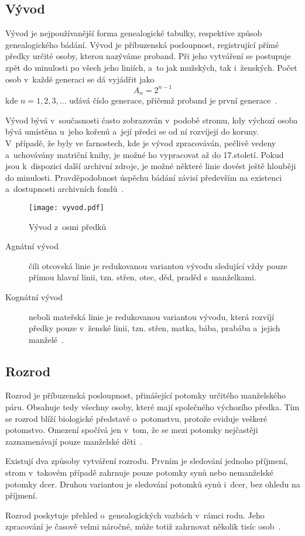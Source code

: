 		\subsection*{Vývod}
		Vývod je nejpoužívanější forma genealogické tabulky, respektive způsob genealogického bádání. Vývod je příbuzenská posloupnost, registrující přímé předky určité osoby, kterou nazýváme proband. Při jeho vytváření se postupuje zpět do minulosti po všech jeho liniích, a~to jak mužských, tak i~ženských. Počet osob v~každé generaci se dá vyjádřit jako 
		\[ A_n = 2^{n-1} \]
		kde \(n = 1, 2, 3, ...\) udává číslo generace, přičemž proband je první generace~\cite{bib:GeneZakl}. \par
		Vývod bývá v~současnosti často zobrazován v~podobě stromu, kdy výchozí osoba bývá umístěna u~jeho kořenů a~její předci se od ní rozvíjejí do koruny. V~případě, že byly ve farnostech, kde je vývod zpracováván, pečlivě vedeny a~uchovávány matriční knihy, je možné ho vypracovat až do 17.století. Pokud jsou k~dispozici další archivní zdroje, je možné některé linie dovést ještě hlouběji do minulosti. Pravděpodobnost úspěchu bádání závisí především na existenci a~dostupnosti archivních fondů~\cite{bib:GeneTypyRodo}. \par
		\begin{figure}[H]
			\centering
			\texttt{[image: vyvod.pdf]}
			\caption{Vývod z~osmi předků}
		\end{figure}
		\begin{description}
			\item [Agnátní vývod] čili otcovská linie je redukovanou variantou vývodu sledující vždy pouze přímou hlavní linii, tzn. střen, otec, děd, praděd s~manželkami.  \par
			\item [Kognátní vývod] neboli mateřská linie je redukovanou variantou vývodu, která rozvíjí předky pouze v~ženské linii, tzn. střen, matka, bába, prabába a~jejich manželé~\cite{bib:GeneTypyRodo}.
		\end{description}
		\subsection*{Rozrod}
		Rozrod je příbuzenská posloupnost, přinášející potomky určitého manželského páru. Obsahuje tedy všechny osoby, které mají společného výchozího předka. Tím se rozrod blíží biologické představě o~potomstvu, protože eviduje veškeré potomstvo. Omezení spočívá jen v~tom, že se mezi potomky nejčastěji zaznamenávají pouze manželské děti~\cite{bib:GeneZakl}. \par
		Existují dva způsoby vytváření rozrodu. Prvním je sledování jednoho příjmení, strom v~takovém případě zahrnuje pouze potomky synů nebo nemanželské potomky dcer. Druhou variantou je sledování potomků synů i~dcer, bez ohledu na příjmení.  \par
		Rozrod poskytuje přehled o~genealogických vazbách v~rámci rodu. Jeho zpracování je časově velmi náročné, může totiž zahrnovat několik tisíc osob~\cite{bib:GeneTypyRodo}.
		
